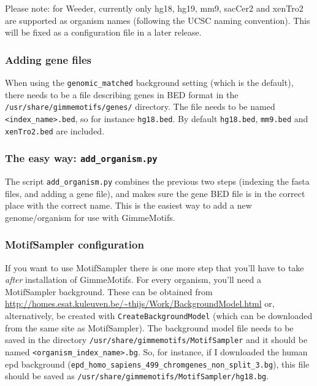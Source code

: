 \documentclass[10pt]{article}
\begin{document}
Please note: for Weeder, currently only hg18, hg19, mm9, sacCer2 and xenTro2 are supported as organism names (following the UCSC naming convention). This will be fixed as a configuration file in a later release.

\subsubsection{Adding gene files}
When using the \texttt{genomic\_matched} background setting (which is the default), there needs to be a file describing genes in BED format in the \texttt{/usr/share/gimmemotifs/genes/} directory. The file needs to be named \texttt{<index\_name>.bed}, so for instance \texttt{hg18.bed}. By default \texttt{hg18.bed}, \texttt{mm9.bed} and \texttt{xenTro2.bed} are included.

\subsubsection{The easy way: \texttt{add\_organism.py}}
The script \texttt{add\_organism.py} combines the previous two steps (indexing the fasta files, and adding a gene file), and makes sure the gene BED file is in the correct place with the correct name. This is the easiest way to add a new genome/organism for use with GimmeMotifs.

\subsubsection{MotifSampler configuration}
\label{sec:MotifSampler}
If you want to use MotifSampler there is one more step that you'll have to take \emph{after} installation of GimmeMotifs. For every organism, you'll need a MotifSampler background. These can be obtained from \url{http://homes.esat.kuleuven.be/~thijs/Work/BackgroundModel.html} or, alternatively, be created with \texttt{CreateBackgroundModel} (which can be downloaded from the same site as MotifSampler). The background model file needs to be saved in the directory \texttt{/usr/share/gimmemotifs/MotifSampler} and it should be named \texttt{<organism\_index\_name>.bg}. So, for instance, if I downloaded the human epd background (\texttt{epd\_homo\_sapiens\_499\_chromgenes\_non\_split\_3.bg}), this file should be saved as \texttt{/usr/share/gimmemotifs/MotifSampler/hg18.bg}.
\end{document}
